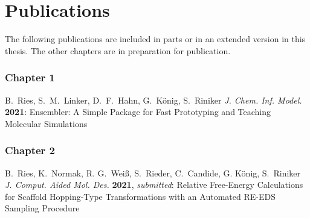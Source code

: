 \chapter{Publications}

The following publications are included in parts or in an extended version in this
thesis. The other chapters are in preparation for publication.

\subsection*{Chapter 1}

B.\ Ries, S.\ M.\ Linker, D.\ F.\ Hahn, G.\ K\"onig, S.\ Riniker {\em J. Chem. Inf. Model.} {\bf 2021}: 
Ensembler: A Simple Package for Fast Prototyping and Teaching Molecular Simulations


\subsection*{Chapter 2}

B.\ Ries, K.\ Normak, R. G.\ Wei\ss, S.\ Rieder, C.\ Candide, G. K\"onig, S.\ Riniker {\em J. Comput. Aided Mol. Des.} {\bf 2021}, {\em submitted}: 
Relative Free-Energy Calculations for Scaffold Hopping-Type Transformations with an Automated RE-EDS Sampling Procedure

